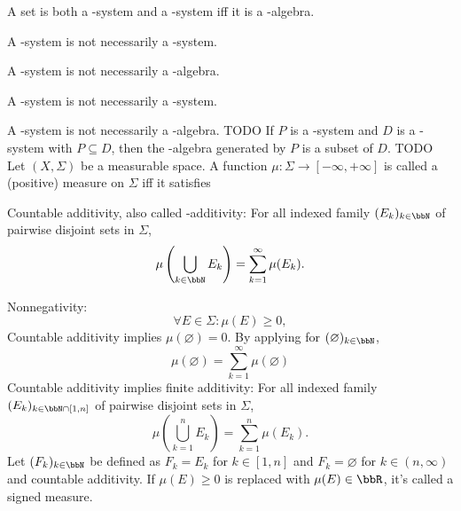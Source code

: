 \documentclass[a4paper,12pt]{article}
\begin{document}
\eit
{}
\ben
\item A set is both a \textpi-system and a \textlambda-system iff it is a \textsigma-algebra.
\item A \textpi-system is not necessarily a \textlambda-system.
\item A \textpi-system is not necessarily a \textsigma-algebra.
\item A \textlambda-system is not necessarily a \textpi-system.
\item A \textlambda-system is not necessarily a \textsigma-algebra.
\een
\bpr
TODO
\epr
{}
If $P$ is a \textpi-system and $D$ is a \textlambda-system with $P\subseteq D$, then the \textsigma-algebra generated by $P$ is a subset of $D$.
\bpr
TODO
\epr
{}
Let $(X,\Sigma)$ be a measurable space. A function $\mu\colon\Sigma\to[-\infty,+\infty]$ is called a (positive) measure on $\Sigma$ iff it satisfies
\bit
\item Countable additivity, also called \text{\textsigma}-additivity: For all indexed family $(E_k)_{k\in\bbN}$ of pairwise disjoint sets in $\Sigma$,
\[\mu\left(\bigcup_{k\in\bbN}E_k\right)=\sum_{k=1}^\infty\mu(E_k).\]
\item Nonnegativity:
\[\forall E\in\Sigma\colon\mu(E)\geq 0,\]
\eit
Countable additivity implies $\mu(\varnothing)=0$.
\bpr
By applying for $(\varnothing)_{k\in\bbN}$,
\[\mu(\varnothing)=\sum_{k=1}^{\infty}\mu(\varnothing)\]
\epr
Countable additivity implies finite additivity: For all indexed family $(E_k)_{k\in\bbN\cap[1,n]}$ of pairwise disjoint sets in $\Sigma$,
\[\mu\left(\bigcup_{k=1}^nE_k\right)=\sum_{k=1}^n\mu(E_k).\]
\bpr
Let $(F_k)_{k\in\bbN}$ be defined as $F_k=E_k$ for $k\in[1,n]$ and $F_k=\varnothing$ for $k\in(n,\infty)$ and countable additivity.
\epr
If $\mu(E)\geq 0$ is replaced with $\mu(E)\in\bbR$, it's called a signed measure.
\end{document}
